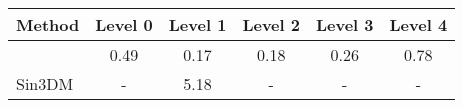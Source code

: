 \begin{tabular}{ l |c  c  c  c  c }\toprule
 Method & Level 0  & Level 1 & Level 2 & Level 3 & Level 4  \\\midrule
\ourmethod{}  &  0.49 & 0.17 & 0.18 & 0.26 &  0.78 \\
Sin3DM  &  - &5.18  & - & - &- \\


\bottomrule

\end{tabular}

